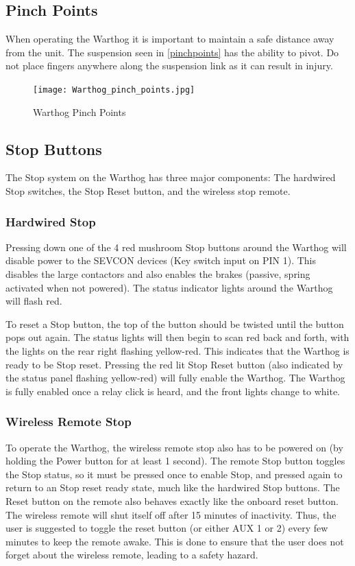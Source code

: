 \documentclass[]{clearpath-latex/clearpath-manual}
\begin{document}
\subsection{Pinch Points}

When operating the Warthog  it is important to maintain a safe distance away from the unit. The suspension seen in \autoref{pinchpoints} has the ability to pivot.  Do not place fingers anywhere along the suspension link as it can result in injury.

\begin{figure}[!htb]
  \centering
  \texttt{[image: Warthog\_pinch\_points.jpg]}
  \caption{Warthog Pinch Points}
  \label{pinchpoints}
\end{figure}

\pagebreak[4]
\subsection{Stop Buttons}

The Stop system on the Warthog has three major components: The hardwired Stop switches, the Stop Reset button, and the wireless stop remote.

\subsubsection{Hardwired Stop}

Pressing down one of the 4 red mushroom Stop buttons around the Warthog will disable power to the SEVCON devices (Key switch input on PIN 1). This disables the large contactors and also enables the brakes (passive, spring activated when not powered). The status indicator lights around the Warthog will flash red.

To reset a Stop button, the top of the button should be twisted until the button pops out again. The status lights will then begin to scan red back and forth, with the lights on the rear right flashing yellow-red. This indicates that the Warthog is ready to be Stop reset. Pressing the red lit Stop Reset button (also indicated by the status panel flashing yellow-red) will fully enable the Warthog. The Warthog is fully enabled once a relay click is heard, and the front lights change to white.

\subsubsection{Wireless Remote Stop}

To operate the Warthog, the wireless remote stop also has to be powered on (by holding the Power button for at least 1 second). The remote Stop button toggles the Stop status, so it must be pressed once to enable Stop, and pressed again to return to an Stop reset ready state, much like the hardwired Stop buttons. The Reset button on the remote also behaves exactly like the onboard reset button. The wireless remote will shut itself off after 15 minutes of inactivity. Thus, the user is suggested to toggle the reset button (or either AUX 1 or 2) every few minutes to keep the remote awake. This is done to ensure that the user does not forget about the wireless remote, leading to a safety hazard.
\end{document}
